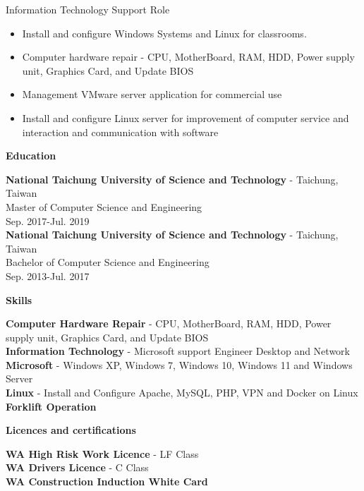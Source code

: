 \documentclass[11pt a4paper]{article}
\begin{document}
Information Technology Support Role

\begin{itemize}
        \item {Install and configure Windows Systems and Linux for classrooms.}
        \item {Computer hardware repair - CPU, MotherBoard, RAM, HDD, Power supply unit, Graphics Card, and Update BIOS}
        \item {Management VMware server application for commercial use}
        \item {Install and configure Linux server for improvement of computer service and interaction and communication with software}
\end{itemize} 


\begin{LARGE}
\textbf{Education
\hrulefill
}
\end{LARGE}

\textbf{National Taichung University of Science and Technology} - Taichung, Taiwan\\
Master of Computer Science and Engineering\\
Sep. 2017-Jul. 2019\\

\textbf{National Taichung University of Science and Technology} - Taichung, Taiwan\\
Bachelor of Computer Science and Engineering\\
Sep. 2013-Jul. 2017\\

\begin{LARGE}
\textbf{Skills
\hrulefill\\
}
\end{LARGE}
\large{
\textbf{Computer Hardware Repair} - CPU, MotherBoard, RAM, HDD, Power supply unit, Graphics Card, and Update BIOS\\
\textbf{Information Technology} - Microsoft support Engineer Desktop and Network\\
\textbf{Microsoft} - Windows XP, Windows 7, Windows 10, Windows 11 and Windows Server\\
\textbf{Linux} - Install and Configure Apache, MySQL, PHP, VPN and Docker on Linux\\
\textbf{
Forklift Operation\\
}}

\begin{LARGE}

\textbf{Licences and certifications
\hrulefill\\
}
\end{LARGE}
\textbf{WA High Risk Work Licence} - LF Class  \\
\textbf{WA Drivers Licence} - C Class\\
\textbf{WA Construction Induction White Card}
\end{document}
